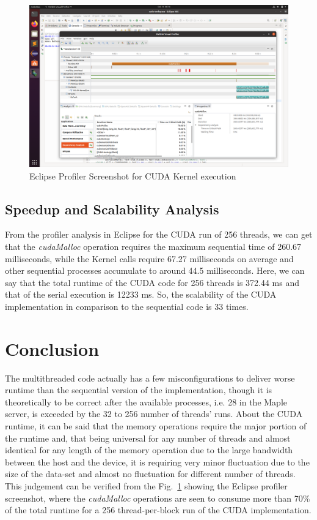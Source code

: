 \documentclass[conference]{IEEEtran}
\begin{document}
\begin{figure}[htbp]
    \centerline{\includegraphics[width=1\linewidth]{report/profiler.png}}
    \caption{Eclipse Profiler Screenshot for CUDA Kernel execution}
    \label{fig7}
\end{figure}


\subsection{Speedup and Scalability Analysis}
From the profiler analysis in Eclipse for the CUDA run of 256 threads, we can get that the \textit{cudaMalloc} operation requires the maximum sequential time of 260.67 milliseconds, while the Kernel calls require 67.27 milliseconds on average and other sequential processes accumulate to around 44.5 milliseconds. Here, we can say that the total runtime of the CUDA code for 256 threads is 372.44 ms and that of the serial execution is 12233 ms. So, the scalability of the CUDA implementation in comparison to the sequential code is 33 times.

\section*{Conclusion}
The multithreaded code actually has a few misconfigurations to deliver worse runtime than the sequential version of the implementation, though it is theoretically to be correct after the available processes, i.e. 28 in the Maple server, is exceeded by the 32 to 256 number of threads' runs. About the CUDA runtime, it can be said that the memory operations require the major portion of the runtime and, that being universal for any number of threads and almost identical for any length of the memory operation due to the large bandwidth between the host and the device, it is requiring very minor fluctuation due to the size of the data-set and almost no fluctuation for different number of threads. This judgement can be verified from the Fig.~\ref{fig7} showing the Eclipse profiler screenshot, where the \textit{cudaMalloc} operations are seen to consume more than 70\% of the total runtime for a 256 thread-per-block run of the CUDA implementation.
\end{document}
